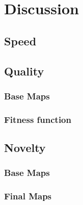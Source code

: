\chapter{Discussion}
\label{discussion_quality}

\section{Speed}
\label{discussion_speed}

\section{Quality}
\label{discussion_quality}

\subsection{Base Maps}
\label{discussion_quality_basemaps}

\subsection{Fitness function}
\label{discussion_quality_fitnessfunction}




\section{Novelty}
\label{discussion_novelty}

\subsection{Base Maps}
\label{discussion_novelty_basemaps}

\subsection{Final Maps}
\label{discussion_novelty_finalmaps}

